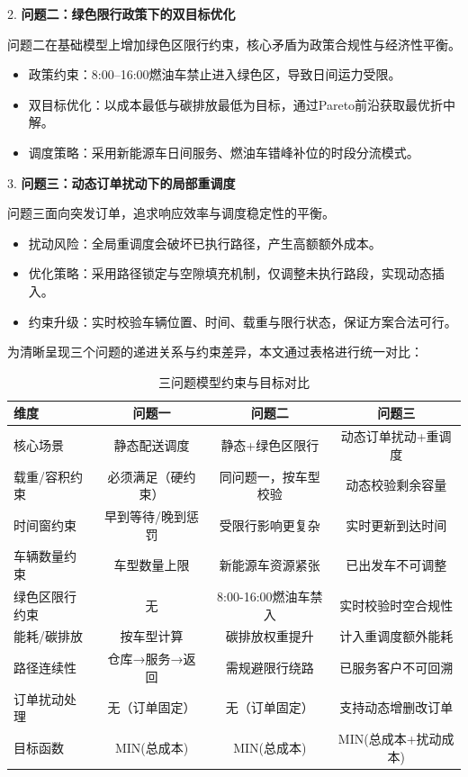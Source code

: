\documentclass[12pt,a4paper]{article}
\begin{document}
2.  \textbf{问题二：绿色限行政策下的双目标优化}

问题二在基础模型上增加绿色区限行约束，核心矛盾为政策合规性与经济性平衡。
\begin{itemize}
    \item 政策约束：8:00–16:00燃油车禁止进入绿色区，导致日间运力受限。
    \item 双目标优化：以成本最低与碳排放最低为目标，通过Pareto前沿获取最优折中解。
    \item 调度策略：采用新能源车日间服务、燃油车错峰补位的时段分流模式。
\end{itemize}

3.  \textbf{问题三：动态订单扰动下的局部重调度}

问题三面向突发订单，追求响应效率与调度稳定性的平衡。
\begin{itemize}
    \item 扰动风险：全局重调度会破坏已执行路径，产生高额额外成本。
    \item 优化策略：采用路径锁定与空隙填充机制，仅调整未执行路段，实现动态插入。
    \item 约束升级：实时校验车辆位置、时间、载重与限行状态，保证方案合法可行。
\end{itemize}

为清晰呈现三个问题的递进关系与约束差异，本文通过表格进行统一对比：

\begin{table}[h]
  \centering
  \caption{三问题模型约束与目标对比}
  \small
  \begin{tabular}{lccc}
    \toprule
    \textbf{维度} & \textbf{问题一} & \textbf{问题二} & \textbf{问题三} \\
    \midrule
    核心场景 & 静态配送调度 & 静态+绿色区限行 & 动态订单扰动+重调度 \\
    载重/容积约束 & 必须满足（硬约束） & 同问题一，按车型校验 & 动态校验剩余容量 \\
    时间窗约束 & 早到等待/晚到惩罚 & 受限行影响更复杂 & 实时更新到达时间 \\
    车辆数量约束 & 车型数量上限 & 新能源车资源紧张 & 已出发车不可调整 \\
    绿色区限行约束 & 无 & 8:00-16:00燃油车禁入 & 实时校验时空合规性 \\
    能耗/碳排放 & 按车型计算 & 碳排放权重提升 & 计入重调度额外能耗 \\
    路径连续性 & 仓库→服务→返回 & 需规避限行绕路 & 已服务客户不可回溯 \\
    订单扰动处理 & 无（订单固定） & 无（订单固定） & 支持动态增删改订单 \\
    目标函数 & MIN(总成本) & MIN(总成本) & MIN(总成本+扰动成本) \\
    \bottomrule
  \end{tabular}
  \label{tab:three_problem_compare}
\end{table}
\end{document}
